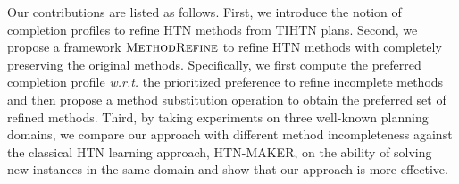 \documentclass[letterpaper]{article} %
\begin{document}

Our contributions are listed as follows.
First, we introduce the notion of completion profiles to refine HTN methods from TIHTN plans.
Second, we propose a framework $\textsc{MethodRefine}$ to refine HTN methods with completely preserving the original methods.
Specifically,
we first compute the preferred completion profile \emph{w.r.t.} the prioritized preference to refine incomplete methods and then propose a method substitution operation to obtain the preferred set of refined methods.
Third, by taking experiments on three well-known planning domains, we compare our approach with different method incompleteness against the classical HTN learning approach, HTN-MAKER, on the ability of solving new instances in the same domain and show that our approach is more effective. %


\end{document}
